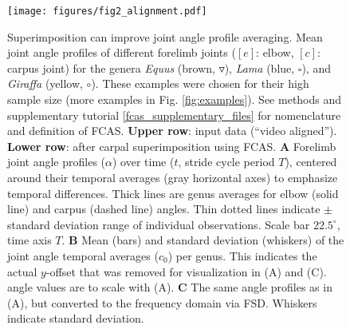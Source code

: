 \begin{figure}[p]%
\centering
\texttt{[image: figures/fig2\_alignment.pdf]}
\caption{Superimposition can improve joint angle profile averaging.
Mean joint angle profiles of different forelimb joints ($[e]$: elbow, $[c]$: carpus joint) for the genera \textit{Equus} (brown, $\triangledown$), \textit{Lama} (blue, $\square$), and \textit{Giraffa} (yellow, $\circ$). These examples were chosen for their high sample size (more examples in Fig. \ref*{fig:examples}). See methods and supplementary tutorial \ref{fcas_supplementary_files} for nomenclature and definition of FCAS.
\textbf{Upper row}: input data (``video aligned''). \textbf{Lower row}: after carpal superimposition using FCAS.
\textbf{A} Forelimb joint angle profiles ($\alpha$) over time ($t$, stride cycle period $T$), centered around their temporal averages (gray horizontal axes) to emphasize temporal differences. Thick lines are genus averages for elbow (solid line) and carpus (dashed line)  angles. Thin dotted lines indicate $\pm$standard deviation range of individual observations. Scale bar $22.5^{\circ}$, time axis $T$.
\textbf{B} Mean (bars) and standard deviation (whiskers) of the joint angle temporal averages ($c_0$) per genus. This indicates the actual $y$-offset that was removed for visualization in (A) and (C).  angle values are to scale with (A).
\textbf{C} The same  angle profiles as in (A), but converted to the frequency domain via FSD. Whiskers indicate standard deviation. }
\label{fig:superimposition}
\end{figure}


